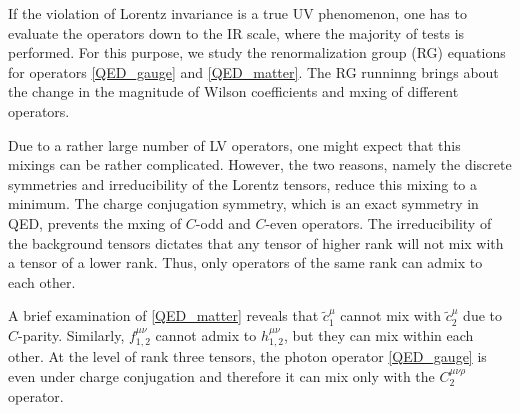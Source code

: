 \documentclass[12pt,preprintnumbers,nofootinbib]{revtex4}
\newcommand{\wt}{\widetilde}
\newcommand{\ov}{\overline}
\begin{document}
	If the violation of Lorentz invariance is a true UV phenomenon, one 
has to evaluate the operators down to the IR scale, where the 
majority of tests is performed. For this purpose, we study
	the renormalization group (RG) equations for operators
	\eqref{QED_gauge} and \eqref{QED_matter}.
	The RG runninng brings about the change in 
    the magnitude of Wilson coefficients 
    and mxing of different operators.

	Due to a rather large number of LV operators, one might expect that 
    this  mixings can be rather complicated.
	However, the two reasons, namely the discrete symmetries and irreducibility
	of the Lorentz tensors, reduce this mixing to
	a minimum.
	The charge conjugation symmetry, which is an exact symmetry in QED,
	prevents the mxing of  $C$-odd and $C$-even operators.
	The irreducibility of the background tensors dictates that any tensor of
	higher rank will not mix with a tensor of a lower rank.
	Thus, only operators of the same rank can admix to each other.
	
	A brief examination of \eqref{QED_matter} reveals that
	$ \wt{c}_1^\mu $ cannot mix with $ \wt{c}_2^\mu $ due to $C$-parity.
	Similarly, $ f_{1,2}^{\mu\nu} $ cannot admix to $ h_{1,2}^{\mu\nu} $,
	but they can mix within each other.
	At the level of rank three tensors, the photon
	operator \eqref{QED_gauge} is even under charge conjugation and
	therefore it can  mix only with the $ C_2^{\mu\nu\rho} $ operator.
		
	
\end{document}
